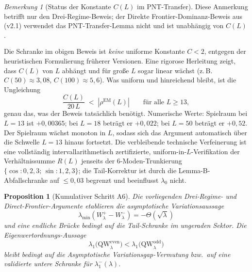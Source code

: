 ﻿\documentclass[12pt,a4paper]{article}
\newtheorem{proposition}[theorem]{Proposition}
\theoremstyle{definition}
\theoremstyle{remark}
\newtheorem{remark}[theorem]{Bemerkung}
\begin{document}
\begin{remark}[Status der Konstante $C(L)$ im PNT-Transfer]
\label{rem:C-constant-caveat-de}
Diese Anmerkung betrifft nur den Drei-Regime-Beweis; der Direkte Frontier-Dominanz-Beweis aus  (v2.1) verwendet das PNT-Transfer-Lemma nicht und ist unabhängig von $C(L)$.

Die Schranke im obigen Beweis ist \emph{keine} uniforme Konstante $C < 2$, entgegen der heuristischen Formulierung früherer Versionen. Eine rigorose Herleitung zeigt, dass $C(L)$ von $L$ abhängt und für große $L$ sogar linear wächst (z.\,B.\ $C(50) \approx 3{,}08$, $C(100) \approx 5{,}6$). Was uniform und hinreichend bleibt, ist die Ungleichung
\[
  \frac{C(L)}{20\,L} \;<\; |\rho^{\mathrm{EM}}(L)| \qquad \text{für alle } L \geq 13,
\]
genau das, was der Beweis tatsächlich benötigt. Numerische Werte: Spielraum bei $L = 13$ ist $+0{,}00365$; bei $L = 18$ beträgt er $+0{,}022$; bei $L = 50$ beträgt er $+0{,}52$. Der Spielraum wächst monoton in $L$, sodass sich das Argument automatisch über die Schwelle $L = 13$ hinaus fortsetzt. Die verbleibende technische Verfeinerung ist eine vollständig intervallarithmetisch zertifizierte, uniform-in-$L$-Verifikation der Verhältnissumme $R(L)$ jenseits der 6-Moden-Trunkierung $\{\cos: 0,2,3;\, \sin: 1,2,3\}$; die Tail-Korrektur ist durch die Lemma-B-Abfallschranke auf $\leq 0{,}03$ begrenzt und beeinflusst $\lambda_0$ nicht.
\end{remark}

\begin{proposition}[Kumulativer Schritt A6]
\label{prop:A6}
Die vorliegenden Drei-Regime- und Direct-Frontier-Argumente
etablieren die asymptotische Variationsaussage
\[
  \lambda_{\min}(W^+_\lambda-W^-_\lambda)=-\Theta(\sqrt{\lambda})
\]
und eine endliche Brücke bedingt auf die Tail-Schranke im ungeraden Sektor.
Die Eigenwertordnungs-Aussage
\[
  \lambda_1\!\bigl(\mathrm{QW}_\lambda^{\mathrm{even}}\bigr)
  < \lambda_1\!\bigl(\mathrm{QW}_\lambda^{\mathrm{odd}}\bigr)
\]
bleibt bedingt auf die Asymptotische Variationsgap-Vermutung
bzw.\ auf eine validierte untere Schranke für
$\lambda_1^-(\lambda)$.
\end{proposition}
\end{document}
